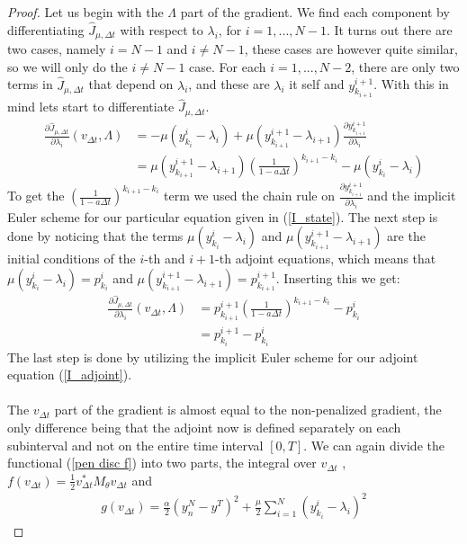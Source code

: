 \begin{proof}
Let us begin with the $\Lambda$ part of the gradient. We find each component by differentiating $\hat J_{\mu,\Delta t} $ with respect to $\lambda_i$, for $i=1,...,N-1$. It turns out there are two cases, namely $i=N-1$ and $i\neq N-1$, these cases are however quite similar, so we will only do the $i\neq N-1$ case. For each $i=1,...,N-2$, there are only two terms in $\hat J_{\mu,\Delta t} $ that depend on $\lambda_i$, and these are $\lambda_i$ it self and $y_{k_{i+1}}^{i+1}$. With this in mind lets start to differentiate $\hat J_{\mu,\Delta t} $.
\begin{align*}
\frac{\partial\hat J_{\mu,\Delta t}}{\partial \lambda_i}(v_{\Delta t},\Lambda) &=-\mu (y_{k_i}^i-\lambda_i) +\mu(y_{k_{i+1}}^{i+1}-\lambda_{i+1})\frac{\partial y_{k_{i+1}}^{i+1}}{\partial \lambda_i}  \\
&=\mu(y_{k_{i+1}}^{i+1}-\lambda_{i+1})(\frac{1}{1-a\Delta t})^{k_{i+1}-k_i} -\mu (y_{k_i}^i-\lambda_i)
\end{align*}
To get the $(\frac{1}{1-a\Delta t})^{k_{i+1}-k_i}$ term we used the chain rule on $\frac{\partial y_{k_{i+1}}^{i+1}}{\partial \lambda_i}$ and the implicit Euler scheme for our particular equation given in (\ref{I_state}). The next step is done by noticing that the terms $\mu (y_{k_i}^i-\lambda_i)$ and $\mu(y_{k_{i+1}}^{i+1}-\lambda_{i+1})$ are the initial conditions of the $i$-th and $i+1$-th adjoint equations, which means that $\mu (y_{k_i}^i-\lambda_i)=p_{k_i}^{i}$ and $\mu(y_{k_{i+1}}^{i+1}-\lambda_{i+1})=p_{k_{i+1}}^{i+1}$. Inserting this we get:
\begin{align*}
\frac{\partial\hat J_{\mu,\Delta t}}{\partial \lambda_i}(v_{\Delta t},\Lambda) &=p_{k_{i+1}}^{i+1}(\frac{1}{1-a\Delta t})^{k_{i+1}-k_i} -p_{k_i}^{i} \\
&= p_{k_{i}}^{i+1}-p_{k_i}^{i}
\end{align*}
The last step is done by utilizing the implicit Euler scheme for our adjoint equation (\ref{I_adjoint}).
\\
\\
The $v_{\Delta t}$ part of the gradient is almost equal to the non-penalized gradient, the only difference being that the adjoint now is defined separately on each subinterval and not on the entire time interval $[0,T]$. We can again divide the functional (\ref{pen disc f}) into two parts, the integral over $v_{\Delta t}$ , $f(v_{\Delta t})=\frac{1}{2} v_{\Delta t}^*M_{\theta}v_{\Delta t}$ and 
\begin{align*}
g(v_{\Delta t}) = \frac{\alpha}{2}(y_n^N-y^T)^2+\frac{\mu }{2}\sum_{i=1}^{N} (y_{k_i}^{i}-\lambda_i)^2

\end{align*}
\end{proof}
